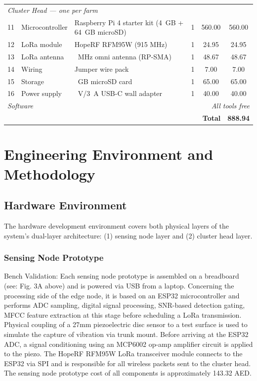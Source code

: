 \documentclass[12pt,a4paper,oneside]{memoir}
\begin{document}
\begin{table}[H]
{\begin{tabular}{cl>{\raggedright\arraybackslash}p{5.2cm}ccc}
        \midrule
        \multicolumn{6}{l}{\textit{Cluster Head — one per farm}} \\
		11 & Microcontroller     & Raspberry Pi 4 starter kit (4~GB + 64~GB microSD) & 1 & 560.00 & 560.00 \\
		12 & LoRa module         & HopeRF RFM95W (915 MHz)                    		 & 1 & 24.95  & 24.95  \\
		13 & LoRa antenna        & 915~MHz omni antenna (RP-SMA)                      & 1 & 48.67  & 48.67  \\
		14 & Wiring              & Jumper wire pack                                   & 1 & 7.00   & 7.00   \\
		15 & Storage             & 32~GB microSD card                                 & 1 & 65.00  & 65.00  \\
		16 & Power supply        & 5~V/3~A USB-C wall adapter                         & 1 & 40.00  & 40.00  \\
        \midrule
        \multicolumn{4}{l}{\textit{Software}} & \multicolumn{2}{r}{\textit{All tools free}} \\
        \midrule
		\multicolumn{5}{r}{\textbf{Total}} & \textbf{888.94} \\
        \bottomrule
    \end{tabular}
    }
\end{table}

\section{Engineering Environment and Methodology}
\label{ch:engineering_env}

\subsection{Hardware Environment}
\label{sec:hw_environment}

The hardware development environment covers both physical layers of the system’s dual-layer architecture: (1) sensing node layer and (2) cluster head layer.

\subsubsection{Sensing Node Prototype}

Bench Validation: Each sensing node prototype is assembled on a breadboard (see: Fig. 3A above) and is powered via USB from a laptop. Concerning the processing side of the edge node, it is based on an ESP32 microcontroller and performs ADC sampling, digital signal processing, SNR-based detection gating, MFCC feature extraction at this stage before scheduling a LoRa transmission. Physical coupling of a 27mm piezoelectric disc sensor to a test surface is used to simulate the capture of vibration via trunk mount. Before arriving at the ESP32 ADC, a signal conditioning using an MCP6002 op-amp amplifier circuit is applied to the piezo. The HopeRF RFM95W LoRa transceiver module connects to the ESP32 via SPI and is responsible for all wireless packets sent to the cluster head. The sensing node prototype cost of all components is approximately 143.32 AED.
\end{document}
